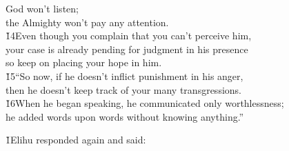 \begin{poetry}
\poemll    God won't listen; \\
\poemlll       the Almighty won't pay any attention. \\
\poeml \v{14}Even though you complain that you can't perceive him, \\
\poemll    your case is already pending for judgment in his presence \\
\poemlll       so keep on placing your hope in him. \\
\poeml \v{15}``So now, if he doesn't inflict punishment in his anger, \\
\poemll    then he doesn't keep track of your many transgressions. \\
\poeml \v{16}When he began speaking, he communicated only worthlessness; \\
\poemll    he added words upon words without knowing anything.''
\end{poetry}

\v{1}Elihu responded again and said:

